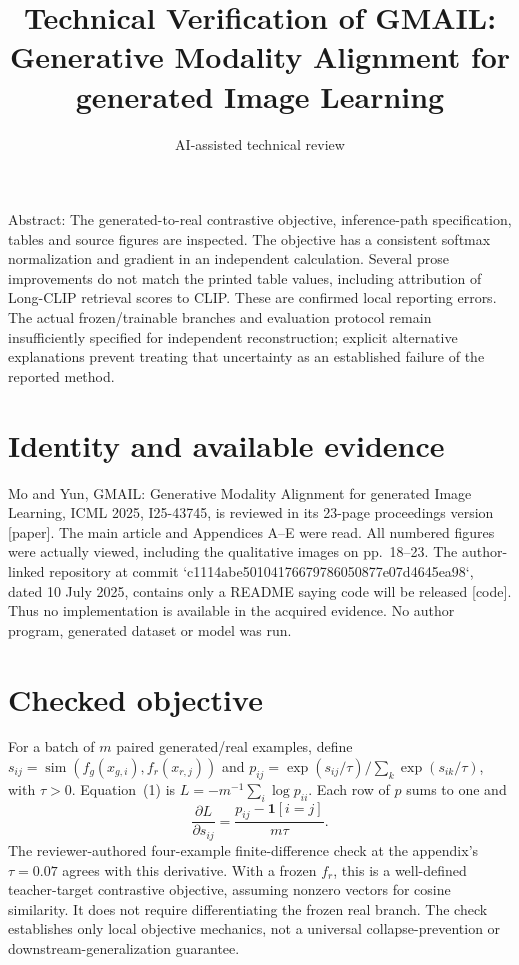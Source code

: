 \documentclass[10pt]{article}
\title{Technical Verification of
GMAIL: Generative Modality Alignment for generated Image Learning}
\author{AI-assisted technical review}
\date{}
\begin{document}
\maketitle
Abstract: The generated-to-real contrastive objective, inference-path specification, tables and source figures are inspected. The objective has a consistent softmax normalization and gradient in an independent calculation. Several prose improvements do not match the printed table values, including attribution of Long-CLIP retrieval scores to CLIP. These are confirmed local reporting errors. The actual frozen/trainable branches and evaluation protocol remain insufficiently specified for independent reconstruction; explicit alternative explanations prevent treating that uncertainty as an established failure of the reported method.\par
\section*{Identity and available evidence}
Mo and Yun, GMAIL: Generative Modality Alignment for generated Image Learning, ICML 2025, I25-43745, is reviewed in its 23-page proceedings version [paper]. The main article and Appendices A–E were read. All numbered figures were actually viewed, including the qualitative images on pp. 18–23. The author-linked repository at commit `c1114abe50104176679786050877e07d4645ea98`, dated 10 July 2025, contains only a README saying code will be released [code]. Thus no implementation is available in the acquired evidence. No author program, generated dataset or model was run.\par
\section*{Checked objective}
For a batch of \(m\) paired generated/real examples, define \(s_{ij}=\operatorname{sim}(f_g(x_{g,i}),f_r(x_{r,j}))\) and \(p_{ij}=\exp(s_{ij}/\tau)/\sum_k\exp(s_{ik}/\tau)\), with \(\tau>0\). Equation (1) is \(L=-m^{-1}\sum_i\log p_{ii}\). Each row of \(p\) sums to one and \[\frac{\partial L}{\partial s_{ij}}=\frac{p_{ij}-\mathbf1[i=j]}{m\tau}.\] The reviewer-authored four-example finite-difference check at the appendix’s \(\tau=0.07\) agrees with this derivative. With a frozen \(f_r\), this is a well-defined teacher-target contrastive objective, assuming nonzero vectors for cosine similarity. It does not require differentiating the frozen real branch. The check establishes only local objective mechanics, not a universal collapse-prevention or downstream-generalization guarantee.\par
\end{document}
